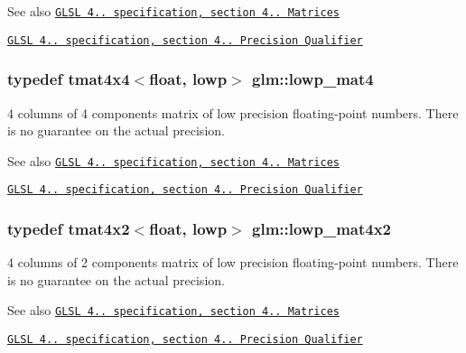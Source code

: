 \begin{DoxySeeAlso}{See also}
\href{http://www.opengl.org/registry/doc/GLSLangSpec.4.20.8.pdf}{\tt G\+L\+S\+L 4.. specification, section 4.. Matrices} 

\href{http://www.opengl.org/registry/doc/GLSLangSpec.4.20.8.pdf}{\tt G\+L\+S\+L 4.. specification, section 4.. Precision Qualifier} 
\end{DoxySeeAlso}
\hypertarget{namespaceglm_a94b6d2ed8f4c62bc72ce3c64dcfcbbad}{}
\subsubsection[{lowp\+\_\+mat4}]{\setlength{\rightskip}{0pt plus 5cm}typedef tmat4x4$<$float, lowp$>$ {\bf glm\+::lowp\+\_\+mat4}}\label{namespaceglm_a94b6d2ed8f4c62bc72ce3c64dcfcbbad}
4 columns of 4 components matrix of low precision floating-\/point numbers. There is no guarantee on the actual precision.

\begin{DoxySeeAlso}{See also}
\href{http://www.opengl.org/registry/doc/GLSLangSpec.4.20.8.pdf}{\tt G\+L\+S\+L 4.. specification, section 4.. Matrices} 

\href{http://www.opengl.org/registry/doc/GLSLangSpec.4.20.8.pdf}{\tt G\+L\+S\+L 4.. specification, section 4.. Precision Qualifier} 
\end{DoxySeeAlso}
\hypertarget{namespaceglm_aac6a972e9b35c84ca15676827cd2d5e3}{}
\subsubsection[{lowp\+\_\+mat4x2}]{\setlength{\rightskip}{0pt plus 5cm}typedef tmat4x2$<$float, lowp$>$ {\bf glm\+::lowp\+\_\+mat4x2}}\label{namespaceglm_aac6a972e9b35c84ca15676827cd2d5e3}
4 columns of 2 components matrix of low precision floating-\/point numbers. There is no guarantee on the actual precision.

\begin{DoxySeeAlso}{See also}
\href{http://www.opengl.org/registry/doc/GLSLangSpec.4.20.8.pdf}{\tt G\+L\+S\+L 4.. specification, section 4.. Matrices} 

\href{http://www.opengl.org/registry/doc/GLSLangSpec.4.20.8.pdf}{\tt G\+L\+S\+L 4.. specification, section 4.. Precision Qualifier} 
\end{DoxySeeAlso}
\hypertarget{namespaceglm_ac228d98de7baadab88ca5d9c72e8cc95}{}
